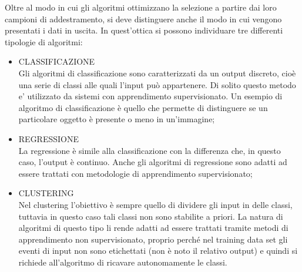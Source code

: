 Oltre al modo in cui gli algoritmi ottimizzano la selezione a partire dai loro campioni di addestramento, si deve distinguere anche il modo in cui vengono presentati i dati in uscita. In quest'ottica si possono individuare tre differenti tipologie di algoritmi:
\begin{itemize}
	
	\item CLASSIFICAZIONE \\
	Gli algoritmi di classificazione sono caratterizzati da un output discreto, cioè una serie di classi alle quali l'input può appartenere. Di solito questo metodo e' utilizzato da sistemi con apprendimento supervisionato. Un esempio di algoritmo di classificazione è quello che permette di distinguere se un particolare oggetto è presente o meno in un'immagine;
	
	\item REGRESSIONE \\
	La regressione è simile alla classificazione con la differenza che, in questo caso, l'output è continuo. Anche gli algoritmi di regressione sono adatti ad essere trattati con metodologie di apprendimento supervisionato;
	
	\item CLUSTERING \\
	Nel clustering l'obiettivo è sempre quello di dividere gli input in delle classi, tuttavia in questo caso tali classi non sono stabilite a priori. La natura di algoritmi di questo tipo li rende adatti ad essere trattati tramite metodi di apprendimento non supervisionato, proprio perché nel training data set gli eventi di input non sono etichettati (non è noto il relativo output) e quindi si richiede all'algoritmo di ricavare autonomamente le classi.
	
\end{itemize}

